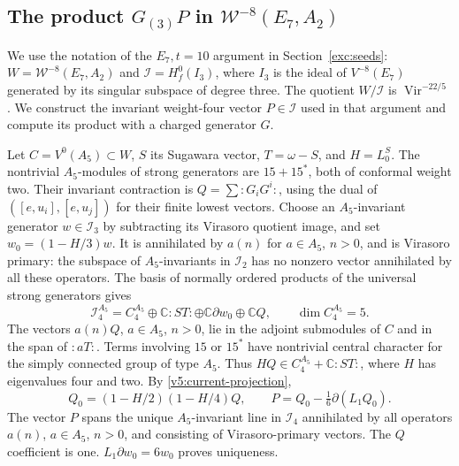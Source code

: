 \documentclass[11pt,a4paper]{amsart}
\numberwithin{equation}{section}
\theoremstyle{definition}
\theoremstyle{remark}
\newcommand{\C}{\mathbb C}
\newcommand{\Vir}{\operatorname{Vir}}
\begin{document}
\subsection{The product \texorpdfstring{$G_{(3)}P$}{G(3)P} in \texorpdfstring{$\mathcal W^{-8}(E_7,A_2)$}{W-8(E7,A2)}}
\label{app:e7-four}
We use the notation of the $E_7,t=10$ argument in
Section~\ref{exc:seeds}: $W=\mathcal W^{-8}(E_7,A_2)$ and
$\mathcal I=H_f^0(I_3)$, where $I_3$ is the ideal of $V^{-8}(E_7)$
generated by its singular subspace of degree three.
The quotient $W/\mathcal I$ is $\Vir^{-22/5}$. We construct the invariant
weight-four vector $P\in \mathcal I$ used in that argument and compute
its product with a charged generator $G$.

Let $C=V^0(A_5)\subset W$, $S$ its Sugawara vector,
$T=\omega-S$, and $H=L_0^S$. The nontrivial $A_5$-modules of strong generators are $15+15^*$,
both of conformal weight two. Their invariant contraction is $Q=\sum:G_iG^i:$,
using the dual of $([e,u_i],[e,u_j])$ for their finite lowest vectors.
Choose an $A_5$-invariant generator $w\in \mathcal I_3$ by subtracting its
Virasoro quotient image, and set $w_0=(1-H/3)w$. It is annihilated by $a(n)$ for $a\in A_5$, $n>0$,
and is Virasoro primary: the subspace of $A_5$-invariants in
$\mathcal I_2$ has no nonzero vector annihilated by all these operators.
The basis of normally ordered products of the universal strong
generators gives
$$
 \mathcal I_4^{A_5}=C_4^{A_5}\oplus\C:ST:\oplus\C\partial w_0\oplus\C Q,
 \qquad\dim C_4^{A_5}=5.
$$
The vectors $a(n)Q$, $a\in A_5$, $n>0$, lie in the adjoint
submodules of $C$ and in the span of $:aT:$.
Terms involving $15$ or $15^*$ have nontrivial central character for
the simply connected group of type $A_5$. Thus
$HQ\in C_4^{A_5}+\C:ST:$, where $H$ has eigenvalues four and two.
By \cref{v5:current-projection},
$$
 Q_0=(1-H/2)(1-H/4)Q,\qquad
 P=Q_0-\tfrac16\partial(L_1Q_0).
$$
The vector $P$ spans the unique $A_5$-invariant line in $\mathcal I_4$ annihilated by all
operators $a(n)$, $a\in A_5$, $n>0$, and consisting of Virasoro-primary
vectors. The $Q$ coefficient is one.
$L_1\partial w_0=6w_0$ proves uniqueness.
\end{document}
